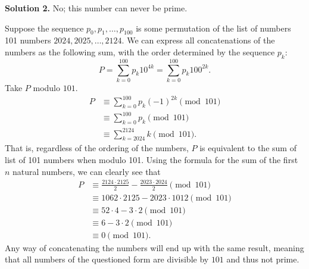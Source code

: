 \begin{solution}{2}
    \textbf{Solution 2.} No; this number can never be prime.

    Suppose the sequence \( p_0, p_1, \ldots, p_{100} \) is some permutation of
    the list of numbers 101 numbers \( 2024, 2025, \ldots, 2124 \). We can
    express all concatenations of the numbers as the following sum, with the
    order determined by the sequence \( p_k \):
    \[
        P = \sum_{k = 0}^{100} p_k 10^{4k} = \sum_{k = 0}^{100} p_k 100^{2k}
    .\]
    Take \( P \) modulo \( 101 \).
    \begin{align*}
        P &\equiv \sum_{k = 0}^{100} p_k (-1)^{2k} \pmod{101} \\
        &\equiv \sum_{k = 0}^{100} p_k \pmod{101} \\
        &\equiv \sum_{k = 2024}^{2124} k \pmod{101}
    .\end{align*}
    That is, regardless of the ordering of the numbers, \( P \) is equivalent
    to the sum of list of 101 numbers when modulo 101. Using the formula for the sum of the
    first \( n \) natural numbers, we can clearly see that
    \begin{align*}
        P &\equiv \frac{2124 \cdot 2125}{2} - \frac{2023 \cdot 2024}{2} \pmod{101} \\
        &\equiv 1062 \cdot 2125 - 2023 \cdot 1012 \pmod{101} \\
        &\equiv 52 \cdot 4 - 3 \cdot 2 \pmod{101} \\
        &\equiv 6 - 3 \cdot 2 \pmod {101} \\
        &\equiv 0 \pmod{101}
    .\end{align*}
    Any way of concatenating the numbers will end up with the same result,
    meaning that all numbers of the questioned form are divisible by \( 101 \)
    and thus not prime.
\end{solution}
